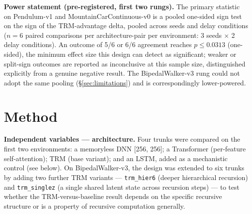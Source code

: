 \documentclass[11pt]{article}
\begin{document}
\textbf{Power statement (pre-registered, first two rungs).} The primary statistic on Pendulum-v1 and MountainCarContinuous-v0 is a pooled one-sided sign test on the sign of the TRM-advantage delta, pooled across seeds and delay conditions ($n=6$ paired comparisons per architecture-pair per environment: 3 seeds $\times$ 2 delay conditions). An outcome of 5/6 or 6/6 agreement reaches $p \leq 0.0313$ (one-sided), the minimum effect size this design can detect as significant; weaker or split-sign outcomes are reported as inconclusive at this sample size, distinguished explicitly from a genuine negative result. The BipedalWalker-v3 rung could not adopt the same pooling (\S\ref{sec:limitations}) and is correspondingly lower-powered.

\section{Method}
\label{sec:method}

\textbf{Independent variables --- architecture.} Four trunks were compared on the first two environments: a memoryless DNN [256, 256]; a Transformer (per-feature self-attention); TRM (base variant); and an LSTM, added as a mechanistic control (see below). On BipedalWalker-v3, the design was extended to six trunks by adding two further TRM variants --- \texttt{trm\_hier6} (deeper hierarchical recursion) and \texttt{trm\_singlez} (a single shared latent state across recursion steps) --- to test whether the TRM-versus-baseline result depends on the specific recursive structure or is a property of recursive computation generally.
\end{document}
